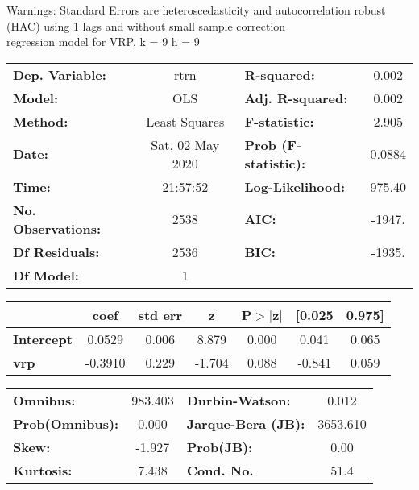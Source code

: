 Warnings: \newline
 [1] Standard Errors are heteroscedasticity and autocorrelation robust (HAC) using 1 lags and without small sample correction\\ 

regression model for VRP, k = 9 h = 9\begin{center}
\begin{tabular}{lclc}
\toprule
\textbf{Dep. Variable:}    &       rtrn       & \textbf{  R-squared:         } &     0.002   \\
\textbf{Model:}            &       OLS        & \textbf{  Adj. R-squared:    } &     0.002   \\
\textbf{Method:}           &  Least Squares   & \textbf{  F-statistic:       } &     2.905   \\
\textbf{Date:}             & Sat, 02 May 2020 & \textbf{  Prob (F-statistic):} &   0.0884    \\
\textbf{Time:}             &     21:57:52     & \textbf{  Log-Likelihood:    } &    975.40   \\
\textbf{No. Observations:} &        2538      & \textbf{  AIC:               } &    -1947.   \\
\textbf{Df Residuals:}     &        2536      & \textbf{  BIC:               } &    -1935.   \\
\textbf{Df Model:}         &           1      & \textbf{                     } &             \\
\bottomrule
\end{tabular}
\begin{tabular}{lcccccc}
                   & \textbf{coef} & \textbf{std err} & \textbf{z} & \textbf{P$> |$z$|$} & \textbf{[0.025} & \textbf{0.975]}  \\
\midrule
\textbf{Intercept} &       0.0529  &        0.006     &     8.879  &         0.000        &        0.041    &        0.065     \\
\textbf{vrp}       &      -0.3910  &        0.229     &    -1.704  &         0.088        &       -0.841    &        0.059     \\
\bottomrule
\end{tabular}
\begin{tabular}{lclc}
\textbf{Omnibus:}       & 983.403 & \textbf{  Durbin-Watson:     } &    0.012  \\
\textbf{Prob(Omnibus):} &   0.000 & \textbf{  Jarque-Bera (JB):  } & 3653.610  \\
\textbf{Skew:}          &  -1.927 & \textbf{  Prob(JB):          } &     0.00  \\
\textbf{Kurtosis:}      &   7.438 & \textbf{  Cond. No.          } &     51.4  \\
\bottomrule
\end{tabular}
\end{center}

